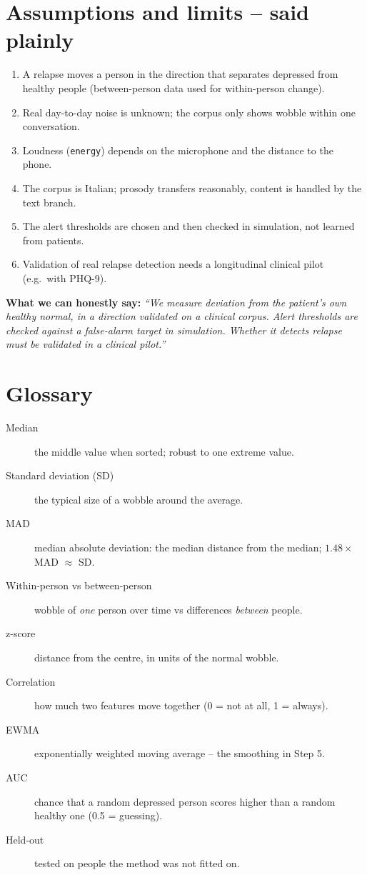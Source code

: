 \documentclass[11pt,a4paper]{article}
\begin{document}
\section{Assumptions and limits -- said plainly}
\begin{enumerate}
\item A relapse moves a person in the direction that separates depressed from healthy people
      (between-person data used for within-person change).
\item Real day-to-day noise is unknown; the corpus only shows wobble within one conversation.
\item Loudness (\texttt{energy}) depends on the microphone and the distance to the phone.
\item The corpus is Italian; prosody transfers reasonably, content is handled by the text branch.
\item The alert thresholds are chosen and then checked in simulation, not learned from patients.
\item Validation of real relapse detection needs a longitudinal clinical pilot (e.g.\ with PHQ-9).
\end{enumerate}

\textbf{What we can honestly say:} \emph{``We measure deviation from the patient's own healthy normal,
in a direction validated on a clinical corpus. Alert thresholds are checked against a false-alarm target
in simulation. Whether it detects relapse must be validated in a clinical pilot.''}

\section*{Glossary}
\begin{description}
\item[Median] the middle value when sorted; robust to one extreme value.
\item[Standard deviation (SD)] the typical size of a wobble around the average.
\item[MAD] median absolute deviation: the median distance from the median; $1.48\times$MAD $\approx$ SD.
\item[Within-person vs between-person] wobble of \emph{one} person over time vs differences \emph{between} people.
\item[z-score] distance from the centre, in units of the normal wobble.
\item[Correlation] how much two features move together (0 = not at all, 1 = always).
\item[EWMA] exponentially weighted moving average -- the smoothing in Step 5.
\item[AUC] chance that a random depressed person scores higher than a random healthy one (0.5 = guessing).
\item[Held-out] tested on people the method was not fitted on.
\end{description}
\end{document}
